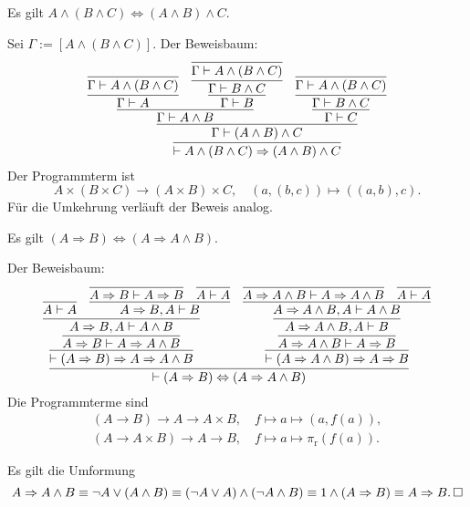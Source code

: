 \newpage
\begin{Satz}[Assoziativgesetz]\newlinefirst
Es gilt $A\land (B\land C)\Leftrightarrow (A\land B)\land C$.
\end{Satz}
\begin{Beweis}
Sei $\Gamma:=[A\land (B\land C)]$. Der Beweisbaum:
\[
\infer{\vdash A\land (B\land C)\Rightarrow (A\land B)\land C}{
  \infer{\Gamma\vdash (A\land B)\land C}{
    \infer{\Gamma\vdash A\land B}{
      \infer{\Gamma\vdash A}{
        \infer{\Gamma\vdash A\land (B\land C)}{}}
    & \infer{\Gamma\vdash B}{
        \infer{\Gamma\vdash B\land C}{
          \infer{\Gamma\vdash A\land (B\land C)}{}}}}
  & \infer{\Gamma\vdash C}{
      \infer{\Gamma\vdash B\land C}{
        \infer{\Gamma\vdash A\land (B\land C)}{}}}}}
\]
Der Programmterm ist
\[A\times (B\times C)\to (A\times B)\times C,\quad
(a, (b, c))\mapsto ((a, b), c).\]
Für die Umkehrung verläuft der Beweis analog.\,\qedsymbol
\end{Beweis}

\begin{Satz}\label{conj-premise}
Es gilt $(A\Rightarrow B)\Leftrightarrow (A\Rightarrow A\land B)$.
\end{Satz}
\begin{Beweis}[Beweis 1]
Der Beweisbaum:
\[
\infer{\vdash (A\Rightarrow B)\Leftrightarrow (A\Rightarrow A\land B)}{
  \infer{\vdash (A\Rightarrow B)\Rightarrow A\Rightarrow A\land B}{
    \infer{A\Rightarrow B\vdash A\Rightarrow A\land B}{
      \infer{A\Rightarrow B, A\vdash A\land B}{
        \infer{A\vdash A}{}
      & \infer{A\Rightarrow B, A\vdash B}{
          \infer{A\Rightarrow B\vdash A\Rightarrow B}{}
        & \infer{A\vdash A}{}}}}}
& \infer{\vdash (A\Rightarrow A\land B)\Rightarrow A\Rightarrow B}{
    \infer{A\Rightarrow A\land B\vdash A\Rightarrow B}{
      \infer{A\Rightarrow A\land B, A\vdash B}{
        \infer{A\Rightarrow A\land B, A\vdash A\land B}{
          \infer{A\Rightarrow A\land B\vdash A\Rightarrow A\land B}{}
        & \infer{A\vdash A}{}}}}}}
\]
Die Programmterme sind
\begin{gather*}
(A\to B)\to A\to A\times B,\quad f\mapsto a\mapsto (a, f(a)),\\
(A\to A\times B)\to A\to B,\quad f\mapsto a\mapsto \pi_{\mathrm r}(f(a)).
\end{gather*}
\end{Beweis}
\begin{Beweis}
Es gilt die Umformung
\[A\Rightarrow A\land B\equiv \neg A\lor (A\land B)
\equiv (\neg A\lor A)\land (\neg A\land B)
\equiv 1\land (A\Rightarrow B)\equiv A\Rightarrow B.\,\square\]
\end{Beweis}

